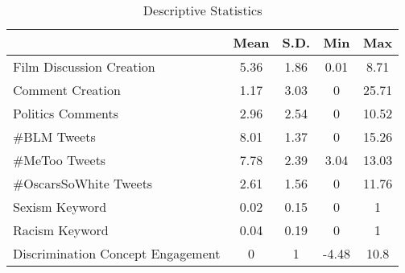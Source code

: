 \begin{table}[htb]
\begin{threeparttable}
\caption{Descriptive Statistics} 
\label{tab:DescStat}
\begingroup{}
\begin{tabular}{l *{4}{@{ }S[table-format=-1.2]@{ }}}
  \toprule
 & {Mean} & {S.D.} & {Min} & {Max} \\ 
  \midrule
Film Discussion Creation & 5.36 & 1.86 & 0.01 & 8.71 \\ 
  Comment Creation & 1.17 & 3.03 & 0 & 25.71 \\ 
  Politics Comments & 2.96 & 2.54 & 0 & 10.52 \\ 
  \#BLM Tweets & 8.01 & 1.37 & 0 & 15.26 \\ 
  \#MeToo Tweets & 7.78 & 2.39 & 3.04 & 13.03 \\ 
  \#OscarsSoWhite Tweets & 2.61 & 1.56 & 0 & 11.76 \\ 
  Sexism Keyword & 0.02 & 0.15 & 0 & 1 \\ 
  Racism Keyword & 0.04 & 0.19 & 0 & 1 \\ 
  Discrimination Concept Engagement & 0 & 1 & -4.48 & 10.8 \\ 
   \bottomrule
\end{tabular}
\endgroup
\end{threeparttable}
\end{table}

